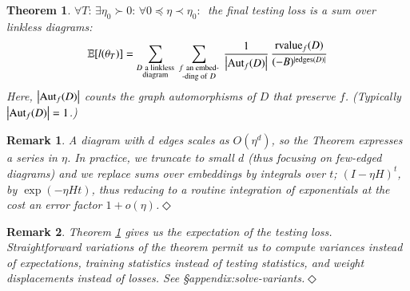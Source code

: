\documentclass[anon,12pt]{colt2021} %
\newtheorem{thm}{Theorem}
\newtheorem{rmk}{Remark}
\newcommand{\squash}{\vspace{-0.15cm}}
\newcommand{\wabs}[1]{\left|#1\right|}
\newcommand{\Aut}{\text{\textnormal{Aut}}}
\newcommand{\rvalue}{\text{\textnormal{rvalue}}}
\newcommand{\edges}{\text{\textnormal{edges}}}
\newcommand{\expc}{\mathbb{E}}
\newcommand{\mend}{\hfill $\Diamond$}
\begin{document}
{            \begin{thm} \label{thm:resum}
                $\forall T:\, \exists \eta_0 \succ 0:\,
                \forall 0\preceq \eta \prec \eta_0:\,$
                the final testing loss is
                a sum over \emph{linkless} diagrams: 
                    \squash
                \begin{equation*} \label{eq:resum}
                    \expc[l(\theta_T)]=
                    \sum_{\substack{D~\text{a linkless} \\ \text{diagram}}}
                    ~
                    \sum_{\substack{f~\text{an embed-} \\ \text{-ding of}~D}}
                    ~
                    \frac{1}{\wabs{\Aut_f(D)}}
                    \,
                    \frac{{\rvalue_f}(D)}{(-B)^{|\edges(D)|}}
                    \squash
                \end{equation*}
                Here, $\wabs{\Aut_f(D)}$ counts the graph automorphisms of $D$
                that preserve $f$. (Typically $\wabs{\Aut_f(D)}=1$.)%
            \end{thm}
            \begin{rmk} \label{rmk:integrate}
                \emph{
                A diagram with $d$ edges scales as
                $O(\eta^d)$, so the Theorem expresses a series in $\eta$.  In
                practice, we truncate to small $d$ (thus focusing on few-edged
                diagrams) and we replace sums over embeddings by integrals over
                $t$; $(I-\eta H)^t$, by $\exp(- \eta H t)$, thus reducing to a
                routine integration of exponentials at the cost an error factor
                $1 + o(\eta)$.}\mend
                \squash
            \end{rmk}
            \begin{rmk}
                \emph{Theorem \ref{thm:resum} gives us the expectation of 
                the testing loss.  Straightforward variations of the theorem permit us
                to compute variances instead of expectations, training
                statistics instead of testing statistics, and weight
                displacements instead of losses.  See \S{appendix:solve-variants}.}\mend
                \squash
            \end{rmk}
}
\end{document}
